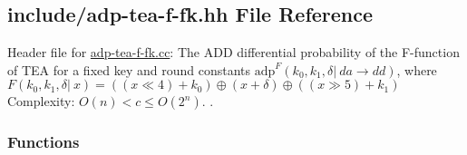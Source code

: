\hypertarget{adp-tea-f-fk_8hh}{\subsection{include/adp-\/tea-\/f-\/fk.hh \-File \-Reference}
\label{adp-tea-f-fk_8hh}
}


\-Header file for \hyperlink{adp-tea-f-fk_8cc}{adp-\/tea-\/f-\/fk.\-cc}\-: \-The \-A\-D\-D differential probability of the \-F-\/function of \-T\-E\-A for a fixed key and round constants $\mathrm{adp}^{F}(k_0, k_1, \delta |~ da \rightarrow dd)$, where $ F(k_0, k_1, \delta |~ x) = ((x \ll 4) + k_0) \oplus (x + \delta) \oplus ((x \gg 5) + k_1)$ \-Complexity\-: $ O(n) < c \le O(2^n) $. .  


\subsubsection*{\-Functions}
